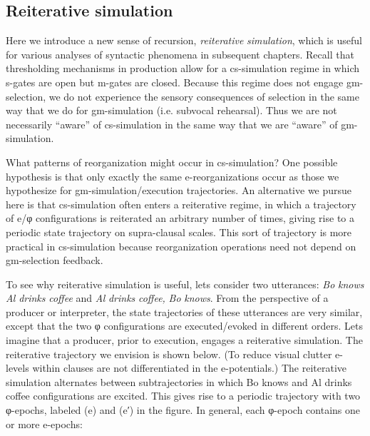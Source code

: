 \subsection{Reiterative simulation}

Here we introduce a new sense of recursion, \textit{reiterative} \textit{simulation}, which is useful for various analyses of syntactic phenomena in subsequent chapters. Recall that thresholding mechanisms in production allow for a cs-simulation regime in which s-gates are open but m-gates are closed. Because this regime does not engage gm-selection, we do not experience the sensory consequences of selection in the same way that we do for gm-simulation (i.e. subvocal rehearsal). Thus we are not necessarily “aware” of cs-simulation in the same way that we are “aware” of gm-simulation.

  What patterns of reorganization might occur in cs-simulation? One possible hypothesis is that only exactly the same e-reorganizations occur as those we hypothesize for gm-simulation/execution trajectories. An alternative we pursue here is that cs-simulation often enters a reiterative regime, in which a trajectory of e/φ configurations is reiterated an arbitrary number of times, giving rise to a periodic state trajectory on supra-clausal scales. This sort of trajectory is more practical in cs-simulation because reorganization operations need not depend on gm-selection feedback.

  To see why reiterative simulation is useful, lets consider two utterances: \textit{Bo} \textit{knows} \textit{Al} \textit{drinks} \textit{coffee} and \textit{Al} \textit{drinks} \textit{coffee,} \textit{Bo} \textit{knows}. From the perspective of a producer or interpreter, the state trajectories of these utterances are very similar, except that the two φ configurations are executed/evoked in different orders. Lets imagine that a producer, prior to execution, engages a reiterative simulation. The reiterative trajectory we envision is shown below. (To reduce visual clutter e-levels within clauses are not differentiated in the e-potentials.) The reiterative simulation alternates between subtrajectories in which {\textbar}Bo knows{\textbar} and {\textbar}Al drinks coffee{\textbar} configurations are excited. This gives rise to a periodic trajectory with two φ-epochs,  labeled (e) and (e′) in the figure. In general, each φ-epoch contains one or more e-epochs:

